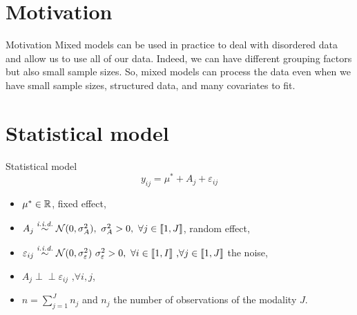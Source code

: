 \documentclass[unknownkeysallowed]{beamer}
\begin{document}
\section{Motivation}
\label{sec:motiv}
\begin{frame}{Motivation}
Mixed models can be used in practice to deal with disordered data and allow us to use all of our data. Indeed, we can have different grouping factors but also small sample sizes. So, mixed models can process the data even when we have small sample sizes, structured data, and many covariates to fit.
\end{frame}


\section{Statistical model}
\label{sec:model}

\begin{frame}{Statistical model}
{\[y_{ij}=\mu^*+ A_j+\varepsilon_{ij}\]}

\medskip

 \begin{itemize}
        \item $\mu^* \in \mathbb{R}$, fixed effect,
        \item $A_j \overset{\textit{i.i.d.}}{\sim} \mathcal{N}(0, \sigma_A^2), \text{ } \sigma_A^2>0, \text{ } \forall j \in \llbracket 1,J \rrbracket$, random effect,
        \item $\varepsilon_{ij} \overset{\textit{i.i.d.}}{\sim} \mathcal{N}(0,\sigma_{\varepsilon}^2) \text{ } \sigma_{\varepsilon}^2>0, \text{ } \forall i \in \llbracket 1,I \rrbracket \text{ ,} \forall j \in \llbracket 1,J \rrbracket$ the noise,
        \item $A_j \perp \!\!\! \perp \varepsilon_{ij} \text{ ,}\forall i,j$,
        \item $n=\sum_{j=1}^{J} n_j$ and $n_j$ the number of observations of the modality $J$.
    \end{itemize}

\end{frame}
\end{document}
